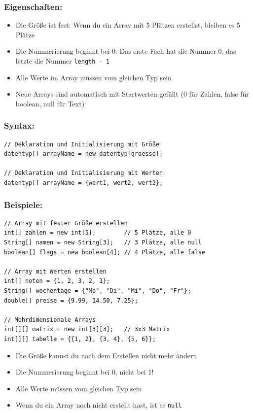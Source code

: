\subsubsection*{Eigenschaften:}
\begin{itemize}
	\item Die Größe ist fest: Wenn du ein Array mit 5 Plätzen erstellst, bleiben es 5 Plätze
	\item Die Nummerierung beginnt bei 0: Das erste Fach hat die Nummer 0, das letzte die Nummer \texttt{length - 1}
	\item Alle Werte im Array müssen vom gleichen Typ sein
	\item Neue Arrays sind automatisch mit Startwerten gefüllt (0 für Zahlen, false für boolean, null für Text)
\end{itemize}

\subsubsection*{Syntax:}
\begin{lstlisting}
// Deklaration und Initialisierung mit Größe
datentyp[] arrayName = new datentyp[groesse];

// Deklaration und Initialisierung mit Werten
datentyp[] arrayName = {wert1, wert2, wert3};
\end{lstlisting}

\subsubsection*{Beispiele:}
\begin{lstlisting}
// Array mit fester Größe erstellen
int[] zahlen = new int[5];        // 5 Plätze, alle 0
String[] namen = new String[3];   // 3 Plätze, alle null
boolean[] flags = new boolean[4]; // 4 Plätze, alle false

// Array mit Werten erstellen
int[] noten = {1, 2, 3, 2, 1};
String[] wochentage = {"Mo", "Di", "Mi", "Do", "Fr"};
double[] preise = {9.99, 14.50, 7.25};

// Mehrdimensionale Arrays
int[][] matrix = new int[3][3];   // 3x3 Matrix
int[][] tabelle = {{1, 2}, {3, 4}, {5, 6}};
\end{lstlisting}

\begin{achtung}
	\begin{itemize}
		\item Die Größe kannst du nach dem Erstellen nicht mehr ändern
		\item Die Nummerierung beginnt bei 0, nicht bei 1!
		\item Alle Werte müssen vom gleichen Typ sein
		\item Wenn du ein Array noch nicht erstellt hast, ist es \texttt{null}
	\end{itemize}
\end{achtung}

